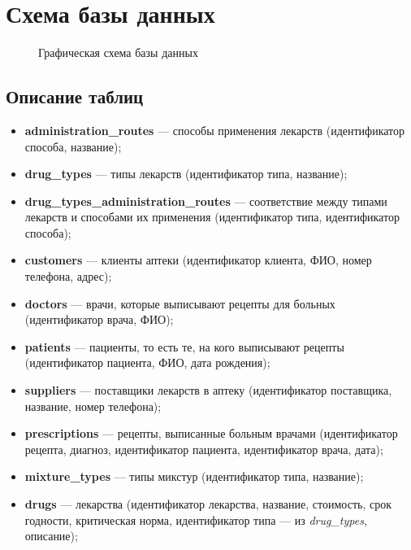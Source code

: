 \documentclass[a4paper]{article}
\newcommand{\dbtable}[1]{\textbf{#1}}
\newcommand{\dbtableref}[1]{\textit{#1}}
\begin{document}
	\section{Схема базы данных}		
		\begin{figure}[H]
			\centering
			\def\svgwidth{\columnwidth}
			
			\caption{\small Графическая схема базы данных}
		\end{figure}
			
		\subsection{Описание таблиц}
			\begin{itemize}
				\item \dbtable{administration\_routes} --- способы применения лекарств (идентификатор способа, название);
					
				\item \dbtable{drug\_types} --- типы лекарств (идентификатор типа, название);
					
				\item \dbtable{drug\_types\_administration\_routes} --- соответствие между типами лекарств и способами их применения (идентификатор типа, идентификатор способа);
					
				\item \dbtable{customers} --- клиенты аптеки (идентификатор клиента, ФИО, номер телефона, адрес);
					
				\item \dbtable{doctors} --- врачи, которые выписывают рецепты для больных (идентификатор врача, ФИО);
					
				\item \dbtable{patients} --- пациенты, то есть те, на кого выписывают рецепты (идентификатор пациента, ФИО, дата рождения);
					
				\item \dbtable{suppliers} --- поставщики лекарств в аптеку (идентификатор поставщика, название, номер телефона);
					
				\item \dbtable{prescriptions} --- рецепты, выписанные больным врачами (идентификатор рецепта, диагноз, идентификатор пациента, идентификатор врача, дата);
					
				\item \dbtable{mixture\_types} --- типы микстур (идентификатор типа, название);
					
				\item \dbtable{drugs} --- лекарства (идентификатор лекарства, название, стоимость, срок годности, критическая норма, идентификатор типа --- из \dbtableref{drug\_types}, описание);
					

\end{itemize}
\end{document}
